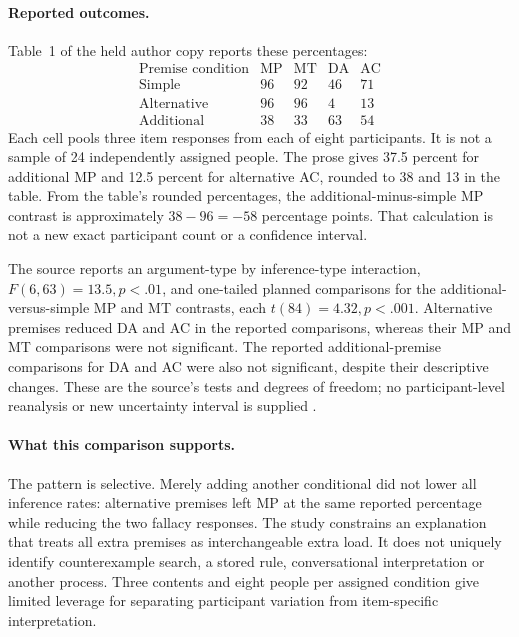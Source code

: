 \paragraph{Reported outcomes.}
Table~1 of the held author copy reports these percentages:
\[
\begin{array}{l|rrrr}
 \text{Premise condition}&\mathrm{MP}&\mathrm{MT}&\mathrm{DA}&\mathrm{AC}\\\hline
 \text{Simple}&96&92&46&71\\
 \text{Alternative}&96&96&4&13\\
 \text{Additional}&38&33&63&54
\end{array}
\]
Each cell pools three item responses from each of eight participants.
It is not a sample of 24 independently assigned people. The prose gives
37.5 percent for additional MP and 12.5 percent for alternative AC,
rounded to 38 and 13 in the table. From the table's rounded percentages,
the additional-minus-simple MP contrast is approximately
\(38-96=-58\) percentage points. That calculation is not a new exact
participant count or a confidence interval.

The source reports an argument-type by inference-type interaction,
\(F(6,63)=13.5,p<.01\), and one-tailed planned comparisons for the
additional-versus-simple MP and MT contrasts, each
\(t(84)=4.32,p<.001\). Alternative premises reduced DA and AC in the
reported comparisons, whereas their MP and MT comparisons were not
significant. The reported additional-premise comparisons for DA and AC
were also not significant, despite their descriptive changes. These are
the source's tests and degrees of freedom; no participant-level reanalysis
or new uncertainty interval is supplied \cite[pp.~68--69]{Byrne1989Suppression}.

\paragraph{What this comparison supports.}
The pattern is selective. Merely adding another conditional did not lower
all inference rates: alternative premises left MP at the same reported
percentage while reducing the two fallacy responses. The study constrains
an explanation that treats all extra premises as interchangeable extra
load. It does not uniquely identify counterexample search, a stored rule,
conversational interpretation or another process. Three contents and eight
people per assigned condition give limited leverage for separating
participant variation from item-specific interpretation.

